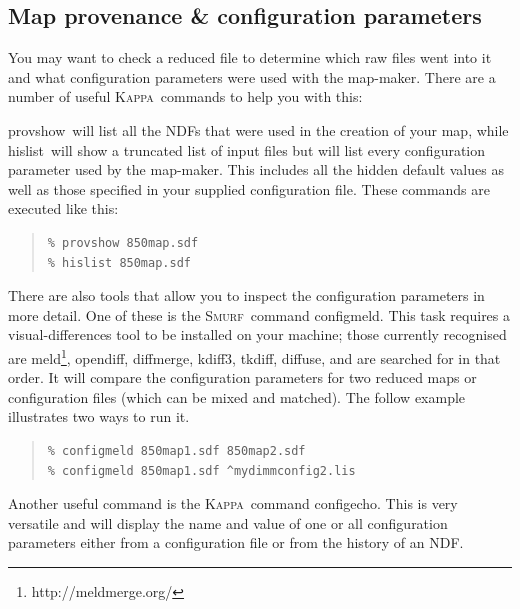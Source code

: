 \documentclass[twoside,11pt]{article}
\newcommand{\htmladdnormallink}[2]{#1}
\newcommand{\latex}[1]{#1}
\newcommand{\xref}[3]{#1}
\newcommand{\xlabel}[1]{}
\renewcommand{\_}{\texttt{\symbol{95}}}
\newenvironment{myquote}{\begin{quote}\begin{small}}{\end{small}\end{quote}}
\newcommand{\Kappa}{\xref{\textsc{Kappa}}{sun95}{}}
\newcommand{\smurf}{\xref{\textsc{Smurf}}{sun258}{}}
\newcommand{\task}[1]{\textsf{#1}}
\newcommand{\configmeld}{\xref{\task{configmeld}}{sun258}{CONFIGMELD}}
\newcommand{\configecho}{\xref{\task{configecho}}{sun95}{CONFIGECHO}}
\newcommand{\hislist}{\xref{\task{hislist}}{sun95}{HISLIST}}
\newcommand{\provshow}{\xref{\task{provshow}}{sun95}{PROVSHOW}}
\begin{document}

\subsection{\xlabel{provenance}Map provenance \& configuration parameters}
\label{sec:prov}

You may want to check a reduced file to determine which raw files went
into it and what configuration parameters were used with the
map-maker. There are a number of useful \Kappa\ commands to help you
with this:

\provshow\ will list all the NDFs that were used in the creation of
your map, while \hislist\ will show a truncated list of input files
but will list every configuration parameter used by the map-maker.
This includes all the hidden default values as well as those specified
in your supplied configuration file. These commands are executed like
this:
\begin{myquote}
\begin{verbatim}
% provshow 850map.sdf
% hislist 850map.sdf
\end{verbatim}
\end{myquote}

There are also tools that allow you to inspect the configuration
parameters in more detail. One of these is the \smurf\ command
\configmeld. This task requires a visual-differences tool to
be installed on your machine; those currently recognised are
\htmladdnormallink{meld}{http://meldmerge.org/}\latex{\footnote{http://meldmerge.org/}},
\htmladdnormallink{opendiff}{http://developer.apple.com/},
\htmladdnormallink{diffmerge}{http://www.sourcegear.com/diffmerge},
\htmladdnormallink{kdiff3}{http://kdiff3.sourceforge.net},
\htmladdnormallink{tkdiff}{http://sourceforge.net/projects/tkdiff},
\htmladdnormallink{diffuse}{http://diffuse.sourceforge.net},
and are searched for in that order. It will compare the
configuration parameters for two reduced maps or configuration files
(which can be mixed and matched). The follow example illustrates two
ways to run it.

\begin{myquote}
\begin{verbatim}
% configmeld 850map1.sdf 850map2.sdf
% configmeld 850map1.sdf ^mydimmconfig2.lis
\end{verbatim}
\end{myquote}
Another useful command is the \Kappa\ command \configecho.
This is very versatile and will display the name and value of one or
all configuration parameters either from a configuration file or from
the history of an NDF.
\end{document}
